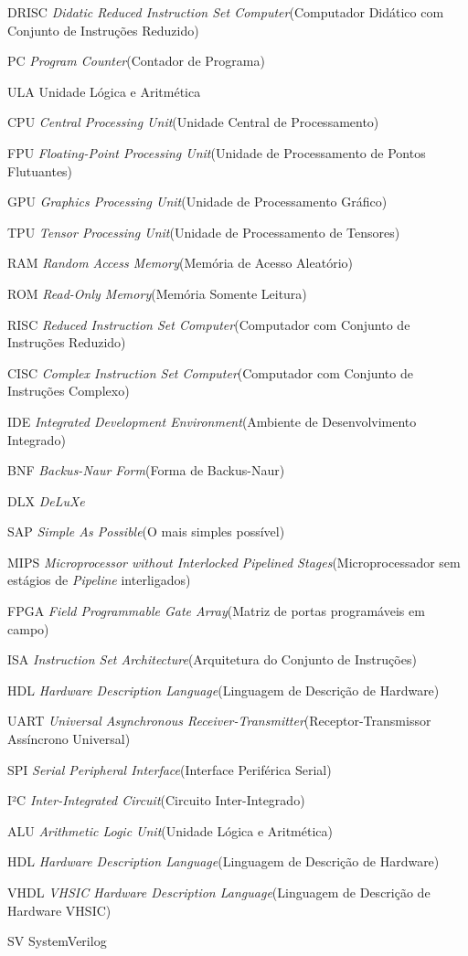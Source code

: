 \documentclass[
	12pt,				%
	openright,			%
	oneside,			%
	a4paper,			%
	english,			%
	french,				%
	spanish,			%
	brazil,				%
	]{abntex2}
\begin{document}
\begin{siglas}
\item[DRISC] \textit{Didatic Reduced Instruction Set Computer}(Computador Didático com Conjunto de Instruções Reduzido)
\item[PC] \textit{Program Counter}(Contador de Programa)
\item[ULA] Unidade Lógica e Aritmética
\item[CPU] \textit{Central Processing Unit}(Unidade Central de Processamento)
\item[FPU] \textit{Floating-Point Processing Unit}(Unidade de Processamento de Pontos Flutuantes)
\item[GPU] \textit{Graphics Processing Unit}(Unidade de Processamento Gráfico)
\item[TPU] \textit{Tensor Processing Unit}(Unidade de Processamento de Tensores)
\item[RAM] \textit{Random Access Memory}(Memória de Acesso Aleatório)
\item[ROM] \textit{Read-Only Memory}(Memória Somente Leitura)
\item[RISC] \textit{Reduced Instruction Set Computer}(Computador com Conjunto de Instruções Reduzido)
\item[CISC] \textit{Complex Instruction Set Computer}(Computador com Conjunto de Instruções Complexo)
\item[IDE] \textit{Integrated Development Environment}(Ambiente de Desenvolvimento Integrado)
\item[BNF] \textit{Backus-Naur Form}(Forma de Backus-Naur)
\item[DLX] \textit{DeLuXe}
\item[SAP] \textit{Simple As Possible}(O mais simples possível)
\item[MIPS] \textit{Microprocessor without Interlocked Pipelined Stages}(Microprocessador sem estágios de \textit{Pipeline} interligados)
\item[FPGA] \textit{Field Programmable Gate Array}(Matriz de portas programáveis em campo)
\item[ISA] \textit{Instruction Set Architecture}(Arquitetura do Conjunto de Instruções)
\item[HDL] \textit{Hardware Description Language}(Linguagem de Descrição de Hardware)
\item[UART] \textit{Universal Asynchronous Receiver-Transmitter}(Receptor-Transmissor Assíncrono Universal)
\item[SPI] \textit{Serial Peripheral Interface}(Interface Periférica Serial)
\item[I²C] \textit{Inter-Integrated Circuit}(Circuito Inter-Integrado)
\item[ALU] \textit{Arithmetic Logic Unit}(Unidade Lógica e Aritmética)
\item[HDL] \textit{Hardware Description Language}(Linguagem de Descrição de Hardware)
\item[VHDL] \textit{VHSIC Hardware Description Language}(Linguagem de Descrição de Hardware VHSIC)
\item[SV] SystemVerilog
\end{siglas}
\end{document}
